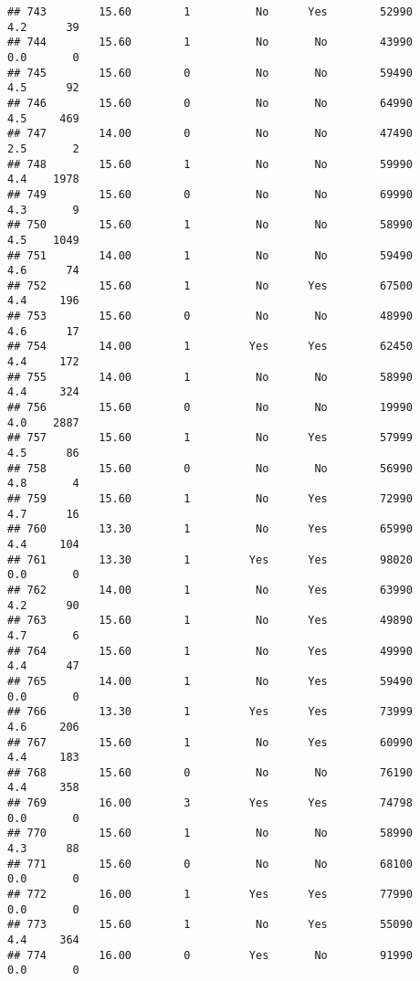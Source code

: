\documentclass[
]{article}
\begin{document}
\begin{verbatim}
## 743        15.60        1          No      Yes        52990         4.2      39
## 744        15.60        1          No       No        43990         0.0       0
## 745        15.60        0          No       No        59490         4.5      92
## 746        15.60        0          No       No        64990         4.5     469
## 747        14.00        0          No       No        47490         2.5       2
## 748        15.60        1          No       No        59990         4.4    1978
## 749        15.60        0          No       No        69990         4.3       9
## 750        15.60        1          No       No        58990         4.5    1049
## 751        14.00        1          No       No        59490         4.6      74
## 752        15.60        1          No      Yes        67500         4.4     196
## 753        15.60        0          No       No        48990         4.6      17
## 754        14.00        1         Yes      Yes        62450         4.4     172
## 755        14.00        1          No       No        58990         4.4     324
## 756        15.60        0          No       No        19990         4.0    2887
## 757        15.60        1          No      Yes        57999         4.5      86
## 758        15.60        0          No       No        56990         4.8       4
## 759        15.60        1          No      Yes        72990         4.7      16
## 760        13.30        1          No      Yes        65990         4.4     104
## 761        13.30        1         Yes      Yes        98020         0.0       0
## 762        14.00        1          No      Yes        63990         4.2      90
## 763        15.60        1          No      Yes        49890         4.7       6
## 764        15.60        1          No      Yes        49990         4.4      47
## 765        14.00        1          No      Yes        59490         0.0       0
## 766        13.30        1         Yes      Yes        73999         4.6     206
## 767        15.60        1          No      Yes        60990         4.4     183
## 768        15.60        0          No       No        76190         4.4     358
## 769        16.00        3         Yes      Yes        74798         0.0       0
## 770        15.60        1          No       No        58990         4.3      88
## 771        15.60        0          No       No        68100         0.0       0
## 772        16.00        1         Yes      Yes        77990         0.0       0
## 773        15.60        1          No      Yes        55090         4.4     364
## 774        16.00        0         Yes       No        91990         0.0       0

\end{verbatim}
\end{document}
